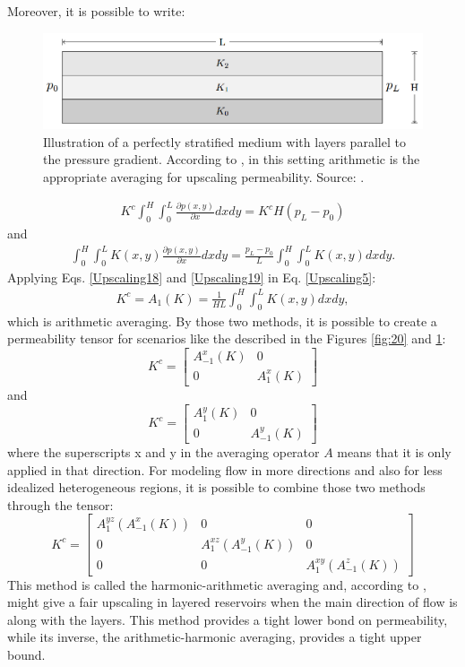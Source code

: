 Moreover, it is possible to write:
\begin{figure}
	\centering
	\includegraphics[width=0.7\linewidth]{Images/21}
	\caption{Illustration of a perfectly stratified medium with layers parallel to the pressure gradient. According to \cite{Lie2015}, in this setting arithmetic is the appropriate averaging for upscaling permeability. Source: \cite{Lie2015}.}
	\label{fig:21}
\end{figure}
\begin{align}
\label{Upscaling18}
K^c\int_{0}^{H}\int_{0}^{L}\frac{\partial p(x,y)}{\partial x}dx dy=K^cH(p_L-p_0)
\end{align}
and
\begin{align}
\label{Upscaling19}
\int_{0}^{H}\int_{0}^{L}K(x,y)\frac{\partial p(x,y)}{\partial x}dx dy=\frac{p_L-p_0}{L}\int_{0}^{H}\int_{0}^{L}K(x,y)dx dy.
\end{align}
Applying Eqs. \ref{Upscaling18} and \ref{Upscaling19} in Eq. \ref{Upscaling5}:
\begin{align}
\label{Upscaling20}
K^c=A_1(K)=\frac{1}{HL}\int_{0}^{H}\int_{0}^{L}K(x,y)dx dy,
\end{align}
which is arithmetic averaging. By those two methods, it is possible to create a permeability tensor for scenarios like the described in the Figures \ref{fig:20} and \ref{fig:21}:
\begin{equation}
K^c=
\begin{bmatrix}
A^x_{-1}(K)	&0\\
0	&A^x_{1}(K)
\end{bmatrix}
\end{equation}
and
\begin{equation}
K^c=
\begin{bmatrix}
A^y_{1}(K)	&0\\
0	&A^y_{-1}(K)
\end{bmatrix}
\end{equation}
where the superscripts x and y in the averaging operator $A$ means that it is only applied in that direction. For modeling flow in more directions and also for less idealized heterogeneous regions, it is possible to combine those two methods through the tensor:
\begin{equation}
\label{arithmeticharmonic}
K^c=
\begin{bmatrix}
A^{yz}_{1}(A^{x}_{-1}(K))	&0	&0\\
0	&A^{xz}_{1}(A^{y}_{-1}(K))	&0\\
0	&0	&A^{xy}_{1}(A^{z}_{-1}(K))
\end{bmatrix}
\end{equation}
This method is called the harmonic-arithmetic averaging and, according to \cite{Lie2015}, might give a fair upscaling in layered reservoirs when the main direction of flow is along with the layers. This method provides a tight lower bond on permeability, while its inverse, the arithmetic-harmonic averaging, provides a tight upper bound.

